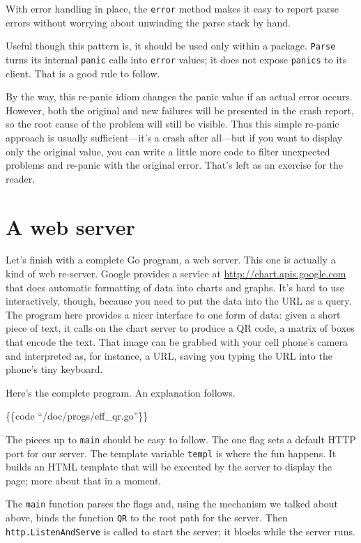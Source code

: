 With error handling in place, the \texttt{error} method makes it easy to
report parse errors without worrying about unwinding the parse stack by
hand.

Useful though this pattern is, it should be used only within a package.
\texttt{Parse} turns its internal \texttt{panic} calls into
\texttt{error} values; it does not expose \texttt{panics} to its client.
That is a good rule to follow.

By the way, this re-panic idiom changes the panic value if an actual
error occurs. However, both the original and new failures will be
presented in the crash report, so the root cause of the problem will
still be visible. Thus this simple re-panic approach is usually
sufficient---it's a crash after all---but if you want to display only
the original value, you can write a little more code to filter
unexpected problems and re-panic with the original error. That's left as
an exercise for the reader.

\section*{A web server}

Let's finish with a complete Go program, a web server. This one is
actually a kind of web re-server. Google provides a service at
\href{http://chart.apis.google.com}{http://chart.apis.google.com} that
does automatic formatting of data into charts and graphs. It's hard to
use interactively, though, because you need to put the data into the URL
as a query. The program here provides a nicer interface to one form of
data: given a short piece of text, it calls on the chart server to
produce a QR code, a matrix of boxes that encode the text. That image
can be grabbed with your cell phone's camera and interpreted as, for
instance, a URL, saving you typing the URL into the phone's tiny
keyboard.

Here's the complete program. An explanation follows.

\{\{code ``/doc/progs/eff\_qr.go''\}\}

The pieces up to \texttt{main} should be easy to follow. The one flag
sets a default HTTP port for our server. The template variable
\texttt{templ} is where the fun happens. It builds an HTML template that
will be executed by the server to display the page; more about that in a
moment.

The \texttt{main} function parses the flags and, using the mechanism we
talked about above, binds the function \texttt{QR} to the root path for
the server. Then \texttt{http.ListenAndServe} is called to start the
server; it blocks while the server runs.

